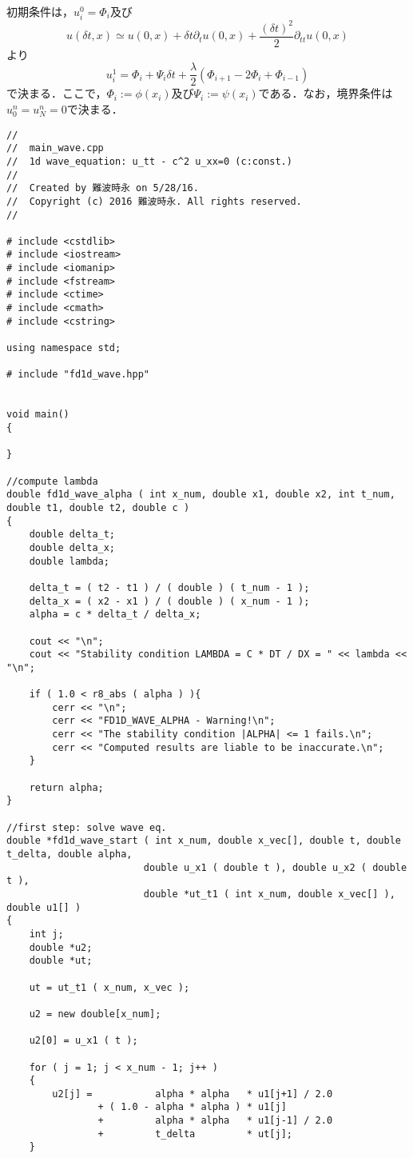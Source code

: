 初期条件は，$u^{0}_{i}=\Phi_{i}$及び
$$
u(\delta t,x)\simeq u(0,x)+\delta t\partial_{t}u(0,x)+\frac{(\delta t)^{2}}{2}\partial_{tt}u(0,x)
$$
より
$$
u^{1}_{i}=\Phi_{i}+\Psi_{i}\delta t+\frac{\lambda}{2}(\Phi_{i+1}-2\Phi_{i}+\Phi_{i-1})
$$
で決まる．ここで，$\Phi_{i}:=\phi(x_i)$及び$\Psi_{i}:=\psi(x_i)$である．なお，境界条件は$u^{n}_{0}=u^{n}_{N}=0$で決まる．

\begin{lstlisting}[caption=C++のコード内からgnuplotを呼び出し$\sin x$を描く]
//
//  main_wave.cpp
//  1d wave_equation: u_tt - c^2 u_xx=0 (c:const.)
//
//  Created by 難波時永 on 5/28/16.
//  Copyright (c) 2016 難波時永. All rights reserved.
//

# include <cstdlib>
# include <iostream>
# include <iomanip>
# include <fstream>
# include <ctime>
# include <cmath>
# include <cstring>

using namespace std;

# include "fd1d_wave.hpp"


void main()
{
	
}

//compute lambda
double fd1d_wave_alpha ( int x_num, double x1, double x2, int t_num, double t1, double t2, double c )
{
	double delta_t;
	double delta_x;
	double lambda;

	delta_t = ( t2 - t1 ) / ( double ) ( t_num - 1 );
	delta_x = ( x2 - x1 ) / ( double ) ( x_num - 1 );
	alpha = c * delta_t / delta_x;

	cout << "\n";
	cout << "Stability condition LAMBDA = C * DT / DX = " << lambda << "\n";

	if ( 1.0 < r8_abs ( alpha ) ){
    	cerr << "\n";
    	cerr << "FD1D_WAVE_ALPHA - Warning!\n";
    	cerr << "The stability condition |ALPHA| <= 1 fails.\n";
    	cerr << "Computed results are liable to be inaccurate.\n";
  	}

  	return alpha;
}

//first step: solve wave eq.
double *fd1d_wave_start ( int x_num, double x_vec[], double t, double t_delta, double alpha,
						double u_x1 ( double t ), double u_x2 ( double t ),
						double *ut_t1 ( int x_num, double x_vec[] ), double u1[] )
{
  	int j;
  	double *u2;
  	double *ut;

  	ut = ut_t1 ( x_num, x_vec );

  	u2 = new double[x_num];

  	u2[0] = u_x1 ( t );

  	for ( j = 1; j < x_num - 1; j++ )
  	{
    	u2[j] =           alpha * alpha   * u1[j+1] / 2.0
        	    + ( 1.0 - alpha * alpha ) * u1[j] 
            	+         alpha * alpha   * u1[j-1] / 2.0
            	+         t_delta         * ut[j];
  	}


\end{lstlisting}
